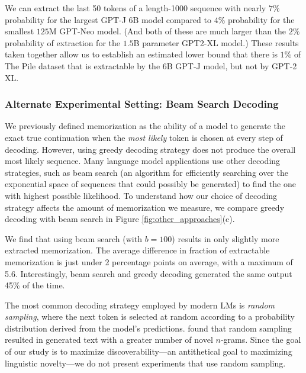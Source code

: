 We can extract the last 50 tokens of
a length-1000 sequence with nearly $7\%$ probability
for the largest GPT-J 6B model compared to $4\%$ probability 
for the smallest $125$M GPT-Neo model. (And both
of these are much larger than the $2\%$ probability 
of extraction for the $1.5$B parameter GPT2-XL model.)
%
These results taken together allow us to establish an estimated lower bound that
there is $1\%$ of The Pile dataset that is extractable
by the 6B GPT-J model, but not by GPT-2 XL.


\subsubsection{Alternate Experimental Setting: Beam Search Decoding}
We previously defined memorization as the ability of a model to generate the exact true continuation when the \emph{most likely} token is chosen at every step of decoding.
However, using greedy decoding strategy does not produce the overall most likely sequence.
Many language model applications use other decoding strategies, such as beam search (an algorithm for efficiently searching over the exponential space of sequences that could possibly be generated) to find the one with highest possible likelihood.
To understand how our choice of decoding strategy affects the amount of memorization we measure, we compare greedy decoding with beam search in Figure \ref{fig:other_approaches}(c).

We find that using beam search (with $b = 100$) results in only slightly more extracted memorization.
The average difference in fraction of extractable memorization is just under 2 percentage points on average, with a maximum of 5.6. %
Interestingly, beam search and greedy decoding generated the same output 45\% of the time.

The most common decoding strategy employed by modern LMs is \emph{random sampling}, where the next token is selected at random according to a probability distribution derived from the model's predictions.
\citet{mccoy2021raven} found that random sampling resulted in generated text with a greater number of novel $n$-grams.
Since the goal of our study is to maximize discoverability---an antithetical goal to maximizing linguistic novelty---we do not present experiments that use random sampling.

